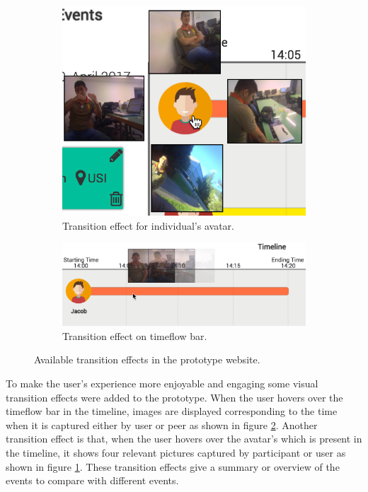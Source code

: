 \documentclass[mscthesis]{usiinfthesis}
\begin{document}
\begin{figure} [!ht]
\begin{subfigure}{0.4\textwidth}
\includegraphics[width=\linewidth]{Hover1}
\caption{Transition effect for individual's avatar.} \label{fig8}
\end{subfigure}
\hspace*{\fill} %
\begin{subfigure}{0.55\textwidth}
\includegraphics[width=\linewidth]{Hover2}
\caption{Transition effect on timeflow bar.} \label{fig9}
\end{subfigure}
\caption{Available transition effects in the prototype website.} \label{fig10}
\end{figure}

To make the user's experience more enjoyable and engaging some visual transition effects were added to the prototype. When the user hovers over the timeflow bar in the timeline, images are displayed corresponding to the time when it is captured either by user or peer as shown in figure \ref{fig9}. Another transition effect is that, when the user hovers over the avatar's which is present in the timeline, it shows four relevant pictures captured by participant or user as shown in figure \ref{fig8}. These transition effects give a summary or overview of the events to compare with different events.
\end{document}
